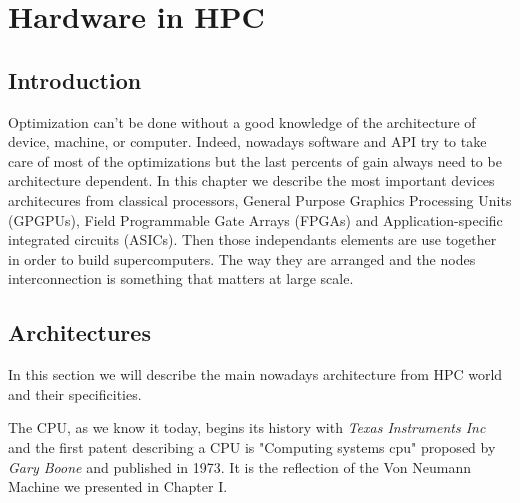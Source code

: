 
\chapter{Hardware in HPC}

\section{Introduction}

Optimization can't be done without a good knowledge of the architecture of device, machine, or computer. 
Indeed, nowadays software and API try to take care of most of the optimizations but the last percents of gain always need to be architecture dependent. 
In this chapter we describe the most important devices architecures from classical processors, General Purpose Graphics Processing Units (GPGPUs), Field Programmable Gate Arrays (FPGAs) and Application-specific integrated circuits (ASICs).
Then those independants elements are use together in order to build supercomputers. 
The way they are arranged and the nodes interconnection is something that matters at large scale. 

\section{Architectures}
In this section we will describe the main nowadays architecture from HPC world and their specificities.

The CPU, as we know it today, begins its history with \textit{Texas Instruments Inc} and the first patent describing a CPU is "Computing systems cpu" proposed by \textit{Gary Boone} and published in 1973.
It is the reflection of the Von Neumann Machine we presented in Chapter I. 

